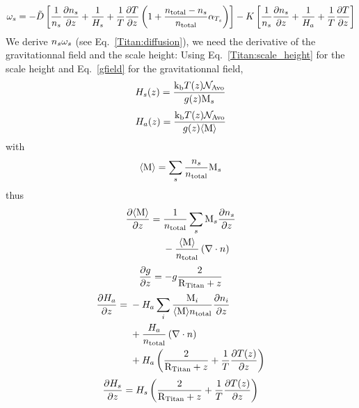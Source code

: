 \begin{equation}
\omega_s = -\tilde{D} 
                \left[
                      \frac{1}{n_s}\frac{\partial n_s}{\partial z} + \frac{1}{H_s} + 
                      \frac{1}{T}\frac{\partial T}{\partial z}\left(1 + \frac{n_\text{total} - n_s}{n_\text{total}}\alpha_{T_s}\right)
                \right] 
           - K 
                \left[
                     \frac{1}{n_s}\frac{\partial n_s}{\partial z} + \frac{1}{H_a} + \frac{1}{T}\frac{\partial T}{\partial z}
                \right]
\label{Titan:omega_diff}
\end{equation}
We derive $n_s\omega_s$ (see Eq.~\ref{Titan:diffusion}),
we need the derivative of the gravitationnal field and the scale height:
Using Eq.~\ref{Titan:scale_height} for the scale height and Eq.~\ref{gfield}
for the gravitationnal field,
\begin{equation}
H_s(z) = \frac{\text{k}_\text{b} T(z) \mathcal{N}_\text{Avo}}{g(z)\text{M}_s}
\label{Titan:scale_height_spec}
\end{equation}
\begin{equation}
H_a(z) = \frac{\text{k}_\text{b} T(z) \mathcal{N}_\text{Avo}}{g(z)\langle\text{M}\rangle}
\label{Titan:scale_height_atm}
\end{equation}
with
\begin{equation}
\langle\text{M}\rangle = \sum_s \frac{n_s}{n_\text{total}} \text{M}_s
\end{equation}
thus
\begin{equation}
\begin{split}
\frac{\partial\langle\text{M}\rangle}{\partial z} = &\;  \frac{1}{n_\text{total}}\sum_s \text{M}_s\frac{\partial n_s}{\partial z}\\
                       &\; - \frac{\langle\text{M}\rangle}{n_\text{total}}\left(\nabla\cdot{\ensuremath{n}}\right)
\end{split}
\end{equation}
\begin{equation}
\frac{\partial g}{\partial z} = -   g \frac{2}{\text{R}_\text{Titan} + z}
\end{equation}
\begin{equation}
\begin{split}
\frac{\partial H_a}{\partial z} = 
                 &\; - H_a\sum_i\frac{\text{M}_i}{\langle\text{M}\rangle n_\text{total}}\frac{\partial n_i}{\partial z} \\
                 &\; + \frac{H_a}{n_\text{total}}\left(\nabla\cdot{\ensuremath{n}}\right) \\
                 &\; + H_a\left(\frac{2}{\text{R}_\text{Titan} + z} + \frac{1}{T}\frac{\partial T(z)}{\partial z}\right)
\end{split}
\end{equation}
\begin{equation}
\frac{\partial H_s}{\partial z} = H_s\left(\frac{2}{\text{R}_\text{Titan} + z} + \frac{1}{T}\frac{\partial T(z)}{\partial z}\right) 
\end{equation}

